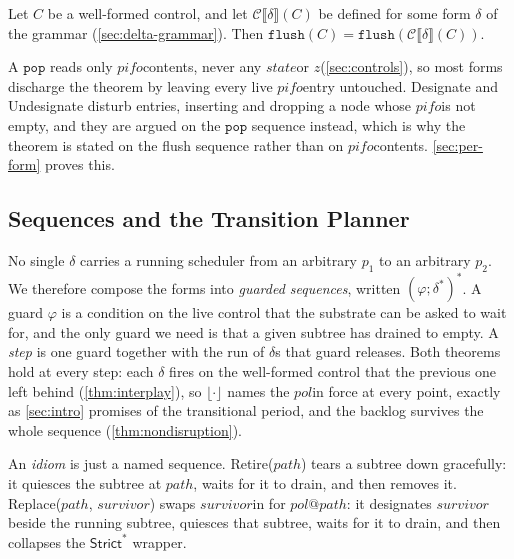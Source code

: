\documentclass[sigplan,anonymous,review,nonacm]{acmart}
\newcommand{\pop}{\ensuremath{\mathtt{pop}}}
\newcommand{\flush}{\ensuremath{\mathtt{flush}}}
\newcommand{\csem}[1]{\mathcal{C}\llbracket #1 \rrbracket}
\newcommand{\notation}[1]{\ensuremath{#1}\ifmmode\else\xspace\fi}
\newcommand{\pol}{\notation{\mathit{pol}}}
\newcommand{\pifo}{\notation{\mathit{pifo}}}
\newcommand{\zz}{\notation{\mathit{z}}}
\newcommand{\stt}{\notation{\mathit{state}}}
\newcommand{\pth}{\notation{\mathit{path}}}
\newcommand{\survivor}{\notation{\mathit{survivor}}}
\newcommand{\Strictstar}{\textsf{Strict}^{*}}
\newcommand{\Designate}{\textsf{Designate}}
\newcommand{\Undesignate}{\textsf{Undesignate}}
\newcommand{\Retire}{\textsf{Retire}}
\newcommand{\Replace}{\textsf{Replace}}
\begin{document}
\begin{theorem}\label{thm:nondisruption}
Let \(C\) be a well-formed control, and let \(\csem{\delta}(C)\) be defined for some form \(\delta\) of the grammar (\cref{sec:delta-grammar}).
Then \(\flush(C) = \flush(\csem{\delta}(C))\).
\end{theorem}

A \pop{} reads only \pifo contents, never any \stt or \zz (\cref{sec:controls}), so most forms discharge the theorem by leaving every live \pifo entry untouched.
\Designate{} and \Undesignate{} disturb entries, inserting and dropping a node whose \pifo is not empty, and they are argued on the \pop{} sequence instead, which is why the theorem is stated on the flush sequence rather than on \pifo contents.
\cref{sec:per-form} proves this.

\subsection{Sequences and the Transition Planner}\label{sec:sequences}\label{sec:planner}

No single \(\delta\) carries a running scheduler from an arbitrary \(p_1\) to an arbitrary \(p_2\).
We therefore compose the forms into \emph{guarded sequences}, written \((\varphi ; \delta^{*})^{*}\).
A guard \(\varphi\) is a condition on the live control that the substrate can be asked to wait for, and the only guard we need is that a given subtree has drained to empty.
A \emph{step} is one guard together with the run of \(\delta\)s that guard releases.
Both theorems hold at every step: each \(\delta\) fires on the well-formed control that the previous one left behind (\cref{thm:interplay}), so \(\lfloor \cdot \rfloor\) names the \pol in force at every point, exactly as \cref{sec:intro} promises of the transitional period, and the backlog survives the whole sequence (\cref{thm:nondisruption}).

An \emph{idiom} is just a named sequence.
\Retire(\pth) tears a subtree down gracefully: it quiesces the subtree at \pth, waits for it to drain, and then removes it.
\Replace(\pth, \survivor) swaps \survivor in for \(\mathit{pol}@\mathit{path}\): it designates \survivor beside the running subtree, quiesces that subtree, waits for it to drain, and then collapses the \(\Strictstar\) wrapper.
\end{document}
